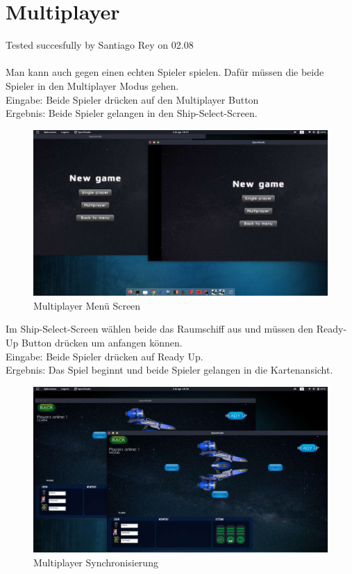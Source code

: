 \documentclass[12pt]{article}
\begin{document}
\section{Multiplayer}
Tested succesfully by Santiago Rey on 02.08\\\\
Man kann auch gegen einen echten Spieler spielen. Dafür müssen die beide Spieler in den Multiplayer Modus gehen.\\
Eingabe: Beide Spieler drücken auf den Multiplayer Button\\
Ergebnis: Beide Spieler gelangen in den Ship-Select-Screen.\\
\begin{figure}[htp]
	\centering
	\includegraphics[scale=0.4]{TestProtocolBilder/Multiplayer/1.jpg}
	\caption{Multiplayer Menü Screen}
\end{figure}
\clearpage
Im Ship-Select-Screen wählen beide das Raumschiff aus und müssen den Ready-Up Button drücken um anfangen können.\\
Eingabe: Beide Spieler drücken auf Ready Up.\\
Ergebnis: Das Spiel beginnt und beide Spieler gelangen in die Kartenansicht.\\
\begin{figure}[htp]
	\centering
	\includegraphics[scale=0.4]{TestProtocolBilder/Multiplayer/2.jpg}
	\caption{Multiplayer Synchronisierung}
\end{figure}
\end{document}

